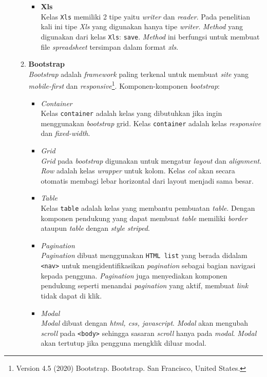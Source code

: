 \documentclass[a4paper,twoside]{article}
\begin{document}
\begin{enumerate}
\begin{enumerate}
\begin{itemize}
	\item \textbf{Xls} \\
	Kelas \texttt{Xls} memiliki 2 tipe yaitu \textit{writer} dan \textit{reader}. Pada penelitian kali ini tipe \textit{Xls} yang digunakan hanya tipe \textit{writer}. \textit{Method} yang digunakan dari kelas \texttt{Xls}: \texttt{save}. \textit{Method} ini berfungsi untuk membuat file \textit{spreadsheet} tersimpan dalam format \textit{xls}.
	\end{itemize}

	\item \textbf{Bootstrap} \\
	\textit{Bootstrap} adalah \textit{framework} paling terkenal untuk membuat \textit{site} yang \textit{mobile-first} dan \textit{res\-pon\-sive}\footnote{Version 4.5 (2020) Bootstrap. Bootstrap. San Francisco, United States.}. Komponen-komponen \textit{bootstrap}:
	\begin{itemize}
		\item \textit{Container} \\
		Kelas \texttt{container} adalah kelas yang dibutuhkan jika ingin menggunakan \textit{bootstrap} grid. Kelas \texttt{container} adalah kelas \textit{responsive} dan \textit{fixed-width}.
		
		\item \textit{Grid} \\
		\textit{Grid} pada \textit{bootstrap} digunakan untuk mengatur \textit{layout} dan \textit{alignment}. \textit{Row} adalah kelas \textit{wrapper} untuk kolom. Kelas \textit{col} akan secara otomatis membagi lebar horizontal dari layout menjadi sama besar.
		
		\item \textit{Table} \\
		Kelas \texttt{table} adalah kelas yang membantu pembuatan \textit{table}. Dengan komponen pendukung yang dapat membuat \textit{table} memiliki \textit{border} ataupun \textit{table} dengan \textit{style striped}.
		
		\item \textit{Pagination} \\
		\textit{Pagination} dibuat menggunakan \texttt{HTML list} yang berada didalam \texttt{<nav>} untuk mengidentifikasikan \textit{pagination} sebagai bagian navigasi kepada pengguna. \textit{Pagination} juga menyediakan komponen pendukung seperti menandai \textit{pagination} yang aktif, membuat \textit{link} tidak dapat di klik.

		\item \textit{Modal} \\
		\textit{Modal} dibuat dengan \textit{html, css, javascript}. \textit{Modal} akan mengubah \textit{scroll} pada \texttt{<body>} sehingga sasaran \textit{scroll} hanya pada \textit{modal}. \textit{Modal} akan tertutup jika pengguna mengklik diluar modal.
		

\end{itemize}
\end{enumerate}
\end{enumerate}
\end{document}
